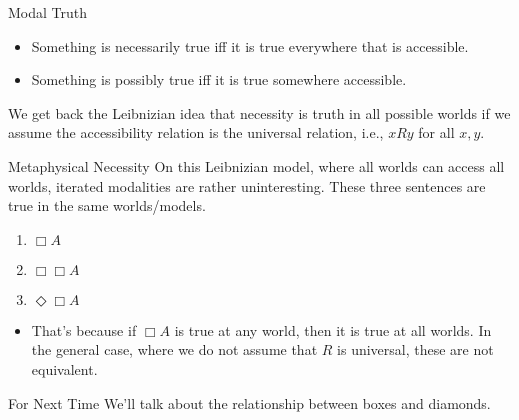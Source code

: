 \documentclass[
  14pt,
  letterpaper,
  ignorenonframetext,
  aspectratio=169,
  handout]{beamer}
\providecommand{\tightlist}{%
  \setlength{\itemsep}{0pt}\setlength{\parskip}{0pt}}\usepackage{longtable,booktabs,array}
\begin{document}
\begin{frame}{Modal Truth}
\protect\hypertarget{modal-truth}{}
\begin{itemize}[<+->]
\tightlist
\item
  Something is necessarily true iff it is true everywhere that is
  accessible.
\item
  Something is possibly true iff it is true somewhere accessible. \pause
\end{itemize}

We get back the Leibnizian idea that necessity is truth in all possible
worlds if we assume the accessibility relation is the universal
relation, i.e., \(xRy\) for all \(x, y\).
\end{frame}

\begin{frame}{Metaphysical Necessity}
\protect\hypertarget{metaphysical-necessity}{}
On this Leibnizian model, where all worlds can access all worlds,
iterated modalities are rather uninteresting. These three sentences are
true in the same worlds/models.

\begin{enumerate}[<+->]
\tightlist
\item
  \(\Box A\)
\item
  \(\Box \Box A\)
\item
  \(\Diamond \Box A\)
\end{enumerate}

\begin{itemize}[<+->]
\tightlist
\item
  That's because if \(\Box A\) is true at any world, then it is true at
  all worlds. In the general case, where we do not assume that \(R\) is
  universal, these are not equivalent.
\end{itemize}
\end{frame}

\begin{frame}{For Next Time}
\protect\hypertarget{for-next-time}{}
We'll talk about the relationship between boxes and diamonds.
\end{frame}
\end{document}
